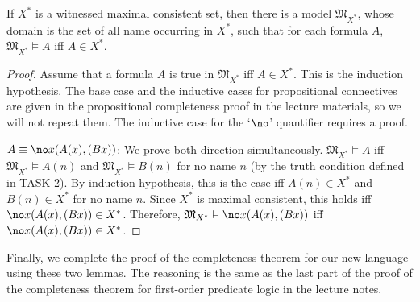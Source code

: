 \begin{lemma}
If $X^*$ is a witnessed maximal consistent set, then there is a model $\mathfrak{M}_{X^*}$, whose domain is the set of all name occurring in $X^*$, such that for each formula $A$, $\mathfrak{M}_{X^*} \vDash A$ iff $A \in X^*$.
\end{lemma}
\begin{proof}
Assume that a formula $A$ is true in $\mathfrak{M}_{X^*}$ iff $A \in X^*$. This is the induction hypothesis. The base case and the inductive cases for propositional connectives are given in the propositional completeness proof in the lecture materials, so we will not repeat them. The inductive case for the `$\no$' quantifier requires a proof.

$A \equiv \no x (A(x), (Bx))$: We prove both direction simultaneously. $\mathfrak{M}_{X^*} \vDash A$ iff $\mathfrak{M}_{X^*} \vDash A(n)$ and $\mathfrak{M}_{X^*} \vDash B(n)$ for no name $n$ (by the truth condition defined in TASK 2). By induction hypothesis, this is the case iff $A(n) \in X^*$ and $B(n) \in X^*$ for no name $n$. Since $X^*$ is maximal consistent, this holds iff $\no x (A(x), (Bx)) \in X^*$. Therefore, $\mathfrak{M}_{X^*} \vDash \no x (A(x), (Bx))$ iff $\no x (A(x), (Bx)) \in X^*$.
\end{proof}

Finally, we complete the proof of the completeness theorem for our new language using these two lemmas. The reasoning is the same as the last part of the proof of the completeness theorem for first-order predicate logic in the lecture notes.